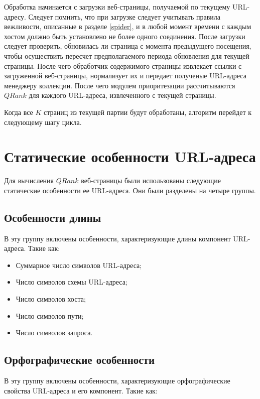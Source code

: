 Обработка начинается с загрузки веб-страницы, получаемой по текущему URL-адресу. Следует помнить, что при загрузке следует учитывать правила вежливости, описанные в разделе \ref{spider}, и в любой момент времени с каждым хостом должно быть установлено не более одного соединения. После загрузки следует проверить, обновилась ли страница с момента предыдущего посещения, чтобы осуществить пересчет предполагаемого периода обновления для текущей страницы. После чего обработчик содержимого страницы извлекает ссылки с загруженной веб-страницы, нормализует их и передает полученые URL-адреса менеджеру коллекции. После чего модулем приоритезации рассчитываются $QRank$ для каждого URL-адреса, извлеченного с текущей страницы.

Когда все $K$ страниц из текущей партии будут обработаны, алгоритм перейдет к следующему шагу цикла.

\section{Статические особенности URL-адреса}
\label{static_features}

Для вычисления $QRank$ веб-страницы были использованы следующие статические особенности ее URL-адреса. Они были разделены на четыре группы.

\subsection*{Особенности длины}

В эту группу включены особенности, характеризующие длины компонент URL-адреса. Такие как:

\begin{itemize}
\item Суммарное число символов URL-адреса;
\item Число символов схемы URL-адреса;
\item Число символов хоста;
\item Число символов пути;
\item Число символов запроса.
\end{itemize}

\subsection*{Орфографические особенности}

В эту группу включены особенности, характеризующие орфографические свойства URL-адреса и его компонент. Такие как:

